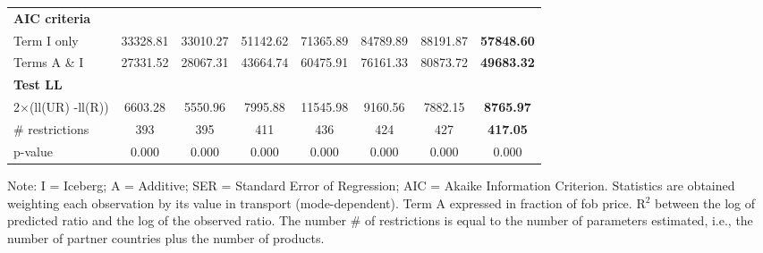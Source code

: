 \documentclass[a4paper,11pt]{article}
\begin{document}
\begin{table}[htbp]
\begin{center}
\begin{tabular}{lccccccc}
\textbf{AIC criteria} & \multicolumn{1}{c}{} & \multicolumn{1}{c}{} & \multicolumn{1}{c}{} & \multicolumn{1}{c}{} & \multicolumn{1}{c}{} & \multicolumn{1}{c}{} & \multicolumn{1}{c}{\textbf{}} \\
Term I only & \multicolumn{1}{c}{33328.81} & \multicolumn{1}{c}{33010.27} & \multicolumn{1}{c}{51142.62} & \multicolumn{1}{c}{71365.89} & \multicolumn{1}{c}{84789.89} & \multicolumn{1}{c}{88191.87} & \multicolumn{1}{c}{\textbf{57848.60}} \\
Terms A \& I & \multicolumn{1}{c}{27331.52} & \multicolumn{1}{c}{28067.31} & \multicolumn{1}{c}{43664.74} & \multicolumn{1}{c}{60475.91} & \multicolumn{1}{c}{76161.33} & \multicolumn{1}{c}{80873.72} & \multicolumn{1}{c}{\textbf{49683.32}} \\
\textbf{Test LL} &       &       &       &       & \multicolumn{1}{c}{} &       & \multicolumn{1}{c}{\textbf{}} \\
2$\times$(ll(UR) -ll(R)) & \multicolumn{1}{c}{6603.28} & \multicolumn{1}{c}{5550.96} & \multicolumn{1}{c}{7995.88} & \multicolumn{1}{c}{11545.98} & \multicolumn{1}{c}{9160.56} & \multicolumn{1}{c}{7882.15} & \multicolumn{1}{c}{\textbf{8765.97}} \\
\# restrictions  & \multicolumn{1}{c}{393} & \multicolumn{1}{c}{395} & \multicolumn{1}{c}{411} & \multicolumn{1}{c}{436} & \multicolumn{1}{c}{424} & \multicolumn{1}{c}{427} & \multicolumn{1}{c}{\textbf{417.05}} \\
p-value & \multicolumn{1}{c}{0.000} & \multicolumn{1}{c}{0.000} & \multicolumn{1}{c}{0.000} & \multicolumn{1}{c}{0.000} & \multicolumn{1}{c}{0.000} & \multicolumn{1}{c}{0.000} & \multicolumn{1}{c}{0.000} \\


\hline\hline

    \end{tabular}%
    \end{center}
  \label{tab:good_fit_ves}%
  \tiny{Note: I = Iceberg; A = Additive; SER = Standard Error of Regression; AIC = Akaike Information Criterion. Statistics are obtained weighting each observation by its value in transport (mode-dependent). Term A expressed in fraction of fob price. R$^{2}$ between the log of predicted ratio and the log of the observed ratio. The number \# of restrictions is equal to the number of parameters estimated, i.e., the number of partner countries plus the number of products.}
\end{table}%


\end{document}
